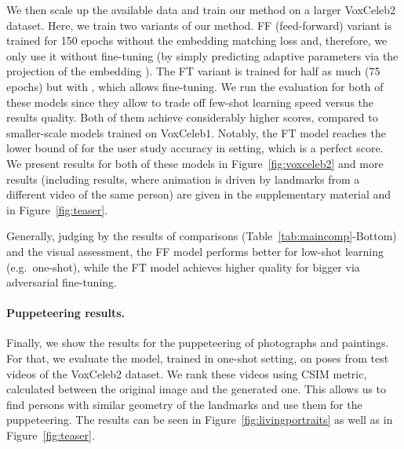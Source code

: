 \documentclass[10pt,twocolumn,letterpaper]{article}
\newcommand{\fig}[1]{Figure~\ref{fig:#1}}
\newcommand{\tab}[1]{Table~\ref{tab:#1}}
\begin{document}
We then scale up the available data and train our method on a larger VoxCeleb2 dataset. Here, we train two variants of our method. FF (feed-forward) variant is trained for 150 epochs without the embedding matching loss  and, therefore, we only use it without fine-tuning (by simply predicting adaptive parameters  via the projection of the embedding ). The FT variant is trained for half as much (75 epochs) but with , which allows fine-tuning. We run the evaluation for both of these models since they allow to trade off few-shot learning speed versus the results quality. Both of them achieve considerably higher scores, compared to smaller-scale models trained on VoxCeleb1. Notably, the FT model reaches the lower bound of  for the user study accuracy in  setting, which is a perfect score. We present results for both of these models in \fig{voxceleb2} and more results (including results, where animation is driven by landmarks from a different video of the same person) are given in the supplementary material and in \fig{teaser}.

Generally, judging by the results of comparisons (\tab{maincomp}-Bottom) and the visual assessment, the FF model performs better for low-shot learning (e.g.\ one-shot), while the FT model achieves higher quality for bigger  via adversarial fine-tuning.

\paragraph{Puppeteering results.}

Finally, we show the results for the puppeteering of photographs and paintings. For that, we evaluate the model, trained in one-shot setting, on poses from test videos of the VoxCeleb2 dataset. We rank these videos using CSIM metric, calculated between the original image and the generated one. This allows us to find persons with similar geometry of the landmarks and use them for the puppeteering. The results can be seen in \fig{livingportraits} as well as in \fig{teaser}.
\end{document}
